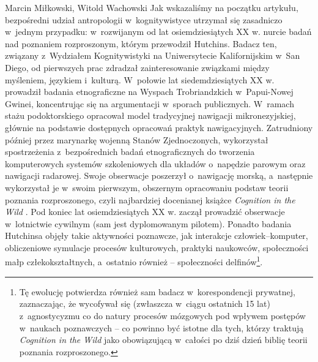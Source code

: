 \begin{artplenv2auth}{Marcin Miłkowski, Witold Wachowski}
Jak wskazaliśmy na początku artykułu, bezpośredni udział antropologii w~kognitywistyce utrzymał się zasadniczo w~jednym przypadku: w~rozwijanym od lat osiemdziesiątych XX w. nurcie badań nad poznaniem rozproszonym, którym przewodził Hutchins. Badacz ten, związany z~Wydziałem Kognitywistyki na Uniwersytecie Kalifornijskim w~San Diego, od pierwszych prac zdradzał zainteresowanie związkami między myśleniem, językiem i~kulturą. W~połowie lat siedemdziesiątych XX w. prowadził badania etnograficzne na Wyspach Trobriandzkich w~Papui-Nowej Gwinei, koncentrując się na argumentacji w~sporach publicznych. W~ramach stażu podoktorskiego opracował model tradycyjnej nawigacji mikronezyjskiej, głównie na podstawie dostępnych opracowań praktyk nawigacyjnych. Zatrudniony później przez marynarkę wojenną Stanów Zjednoczonych, wykorzystał spostrzeżenia z~bezpośrednich badań etnograficznych do tworzenia komputerowych systemów szkoleniowych dla układów o~napędzie parowym oraz nawigacji radarowej. Swoje obserwacje poszerzył o~nawigację morską, a~następnie wykorzystał je w~swoim pierwszym, obszernym opracowaniu podstaw teorii poznania rozproszonego, czyli najbardziej docenianej książce \textit{Cognition in the Wild}
\parencite*[][]{hutchins_cognition_1995}. %
 Pod koniec lat osiemdziesiątych XX w. zaczął prowadzić obserwacje w~lotnictwie cywilnym (sam jest dyplomowanym pilotem). Ponadto badania Hutchinsa objęły takie aktywności poznawcze, jak interakcje człowiek–komputer, obliczeniowe symulacje procesów kulturowych, praktyki naukowców, społeczności małp człekokształtnych, a~ostatnio również -- społeczności delfinów\footnote{Tę ewolucję potwierdza również sam badacz w~korespondencji prywatnej, zaznaczając, że wycofywał się (zwłaszcza w~ciągu ostatnich 15 lat) z~agnostycyzmu co do natury procesów mózgowych pod wpływem postępów w~naukach poznawczych -- co powinno być istotne dla tych, którzy traktują \textit{Cognition in the Wild} 
\parencite*[][]{hutchins_cognition_1995} %
 jako obowiązującą w~całości po dziś dzień biblię teorii poznania rozproszonego.}.


\end{artplenv2auth}
